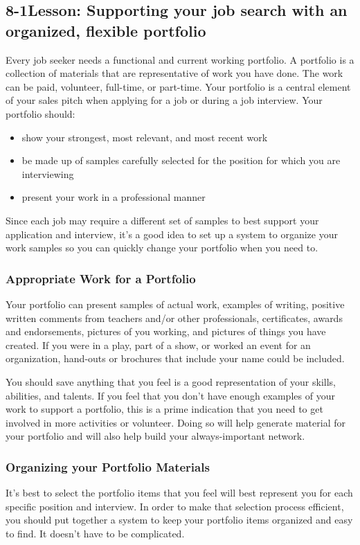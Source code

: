 \pagebreak \subsection*{8-1\quad Lesson: Supporting your job search with an organized, flexible portfolio}
Every job seeker needs a functional and current working portfolio. A portfolio is a collection of materials that are representative of work you have done. The work can be paid, volunteer, full-time, or part-time. Your portfolio is a central element of your sales pitch when applying for a job or during a job interview.
Your portfolio should:
\begin{itemize}[leftmargin=1.0cm]
	\item show your strongest, most relevant, and most recent work
	\item be made up of samples carefully selected for the position for which you are interviewing
	\item present your work in a professional manner
\end{itemize}
Since each job may require a different set of samples to best support your application and interview, it's a good idea to set up a system to organize your work samples so you can quickly change your portfolio when you need to.
\subsubsection*{Appropriate Work for a Portfolio}
Your portfolio can present samples of actual work, examples of writing, positive written comments from teachers and/or other professionals, certificates, awards and endorsements, pictures of you working, and pictures of things you have created. If you were in a play, part of a show, or worked an event for an organization, hand-outs or brochures that include your name could be included.

You should save anything that you feel is a good representation of your skills, abilities, and talents. If you feel that you don't have enough examples of your work to support a portfolio, this is a prime indication that you need to get involved in more activities or volunteer. Doing so will help generate material for your portfolio and will also help build your always-important network.
\subsubsection*{Organizing your Portfolio Materials}
It's best to select the portfolio items that you feel will best represent you for each specific position and interview. In order to make that selection process efficient, you should put together a system to keep your portfolio items organized and easy to find. It doesn't have to be complicated.

